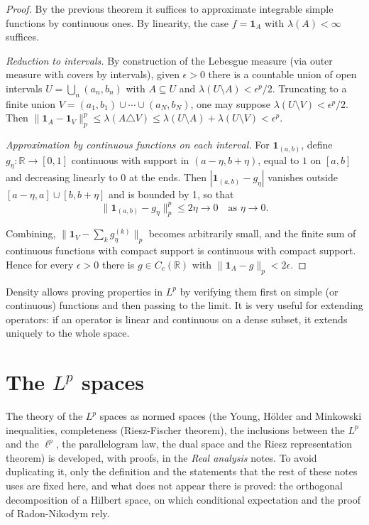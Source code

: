 \documentclass[11pt, a4paper]{article}
\begin{document}
\begin{proof}
By the previous theorem it suffices to approximate integrable simple functions by continuous ones. By
linearity, the case $f = \mathbf{1}_A$ with $\lambda(A) < \infty$ suffices.

\textit{Reduction to intervals.} By construction of the Lebesgue measure (via outer
measure with covers by intervals), given $\epsilon > 0$ there is a countable union of
open intervals $U = \bigcup_n (a_n, b_n)$ with $A \subseteq U$ and $\lambda(U \setminus A) <
\epsilon^p / 2$. Truncating to a finite union $V = (a_1, b_1) \cup \cdots \cup (a_N, b_N)$,
one may suppose $\lambda(U \setminus V) < \epsilon^p / 2$. Then $\|\mathbf{1}_A -
\mathbf{1}_V\|_p^p \le \lambda(A \triangle V) \le \lambda(U \setminus A) + \lambda(U \setminus V) <
\epsilon^p$.

\textit{Approximation by continuous functions on each interval.} For $\mathbf{1}_{(a, b)}$, define
$g_\eta: \mathbb{R} \to [0, 1]$ continuous with support in $(a - \eta, b + \eta)$, equal to $1$ on
$[a, b]$ and decreasing linearly to $0$ at the ends. Then $|\mathbf{1}_{(a, b)} - g_\eta|$
vanishes outside $[a - \eta, a] \cup [b, b + \eta]$ and is bounded by 1, so that
$$ \|\mathbf{1}_{(a, b)} - g_\eta\|_p^p \le 2 \eta \to 0 \quad \text{as } \eta \to 0. $$

Combining, $\|\mathbf{1}_V - \sum_k g_\eta^{(k)}\|_p$ becomes arbitrarily small, and the finite
sum of continuous functions with compact support is continuous with compact support. Hence for every
$\epsilon > 0$ there is $g \in C_c(\mathbb{R})$ with $\|\mathbf{1}_A - g\|_p < 2 \epsilon$.
\end{proof}

\obs Density allows proving properties in $L^p$ by verifying them first on simple (or
continuous) functions and then passing to the limit. It is very useful for extending operators: if an operator is
linear and continuous on a dense subset, it extends uniquely to the whole space.

\newpage

\section{The \texorpdfstring{$L^p$}{Lp} spaces}

The theory of the $L^p$ spaces as normed spaces (the Young, Hölder and
Minkowski inequalities, completeness (Riesz-Fischer theorem), the inclusions between the $L^p$ and the
$\ell^p$, the parallelogram law, the dual space and the Riesz representation theorem)
is developed, with proofs, in the \emph{Real analysis} notes. To avoid duplicating it,
only the definition and the statements that the rest of these notes uses are fixed here, and
what does not appear there is proved: the orthogonal decomposition of a Hilbert space, on
which conditional expectation and the proof of Radon-Nikodym rely.
\end{document}
